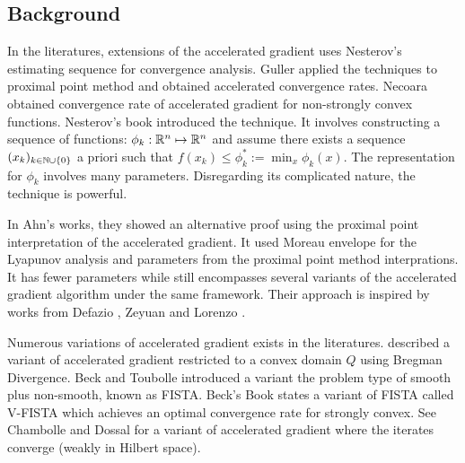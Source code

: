 \documentclass[12pt]{article}
\begin{document}

    \subsection{Background}
        In the literatures, extensions of the accelerated gradient uses Nesterov's estimating sequence for convergence analysis. 
        Guller \cite{guler_new_1992} applied the techniques to proximal point method and obtained accelerated convergence rates. 
        Necoara \cite{necoara_linear_2019} obtained convergence rate of accelerated gradient for non-strongly convex functions. 
        Nesterov's book \cite[chapter 2]{nesterov_lectures_2018} introduced the technique. 
        It involves constructing a sequence of functions: $\phi_k:\mathbb R^n \mapsto \mathbb R^n$ and assume there exists a sequence $(x_k)_{k\in \mathbb N \cup \{0\}}$ a priori such that $f(x_k) \le \phi_k^* := \min_x \phi_k(x)$. 
        The representation for $\phi_k$ involves many parameters. 
        Disregarding its complicated nature, the technique is powerful. 
        
        \par
        In Ahn's works, they showed an alternative proof using the proximal point interpretation of the accelerated gradient. 
        It used Moreau envelope for the Lyapunov analysis and parameters from the proximal point method interprations.  
        It has fewer parameters while still encompasses several variants of the accelerated gradient algorithm under the same framework. 
        Their approach is inspired by works from Defazio \cite{defazio_curved_2019}, Zeyuan and Lorenzo \cite{allen-zhu_linear_2016}. 
        
        \par
        Numerous variations of accelerated gradient exists in the literatures. \cite[(6.1.19)]{nesterov_lectures_2018} described a variant of accelerated gradient restricted to a convex domain $Q$ using Bregman Divergence. 
        Beck and Toubolle \cite{beck_fast_2009} introduced a variant the problem type of smooth plus non-smooth, known as FISTA. 
        Beck's Book \cite[(10.7.7)]{beck_first-order_2017} states a variant of FISTA called V-FISTA which achieves an optimal convergence rate for strongly convex. 
        See Chambolle and Dossal \cite{chambolle_convergence_2015} for a variant of accelerated gradient where the iterates converge (weakly in Hilbert space). 
        
\end{document}
